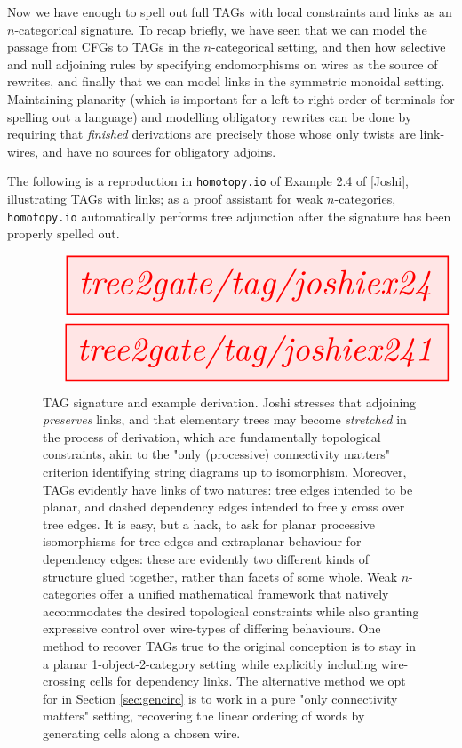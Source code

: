 Now we have enough to spell out full TAGs with local constraints and links as an $n$-categorical signature. To recap briefly, we have seen that we can model the passage from CFGs to TAGs in the $n$-categorical setting, and then how selective and null adjoining rules by specifying endomorphisms on wires as the source of rewrites, and finally that we can model links in the symmetric monoidal setting. Maintaining planarity (which is important for a left-to-right order of terminals for spelling out a language) and modelling obligatory rewrites can be done by requiring that \emph{finished} derivations are precisely those whose only twists are link-wires, and have no sources for obligatory adjoins.

\begin{example}
The following is a reproduction in \texttt{homotopy.io} of Example 2.4 of [Joshi], illustrating TAGs with links; as a proof assistant for weak $n$-categories, \texttt{homotopy.io} automatically performs tree adjunction after the signature has been properly spelled out.

\begin{figure}[h!]
\centering
\[\resizebox{\textwidth}{!}{\tikzfig{tree2gate/tag/joshiex24}}\]
\[\resizebox{\textwidth}{!}{\tikzfig{tree2gate/tag/joshiex241}}\]
\caption{TAG signature and example derivation. Joshi stresses that adjoining \emph{preserves} links, and that elementary trees may become \emph{stretched} in the process of derivation, which are fundamentally topological constraints, akin to the "only (processive) connectivity matters" criterion identifying string diagrams up to isomorphism. Moreover, TAGs evidently have links of two natures: tree edges intended to be planar, and dashed dependency edges intended to freely cross over tree edges. It is easy, but a hack, to ask for planar processive isomorphisms for tree edges and extraplanar behaviour for dependency edges: these are evidently two different kinds of structure glued together, rather than facets of some whole. Weak $n$-categories offer a unified mathematical framework that natively accommodates the desired topological constraints while also granting expressive control over wire-types of differing behaviours. One method to recover TAGs true to the original conception is to stay in a planar 1-object-2-category setting while explicitly including wire-crossing cells for dependency links. The alternative method we opt for in Section \ref{sec:gencirc} is to work in a pure "only connectivity matters" setting, recovering the linear ordering of words by generating cells along a chosen wire.}
\end{figure}


\end{example}
